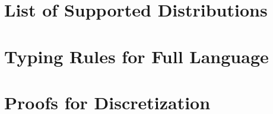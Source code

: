 \appendix
\section{List of Supported \Slice{} Distributions}\label{appen:supported-distributions}


\section{Typing Rules for Full \Slice{} Language}\label{appen:typing-rules}




\section{Proofs for Discretization}
